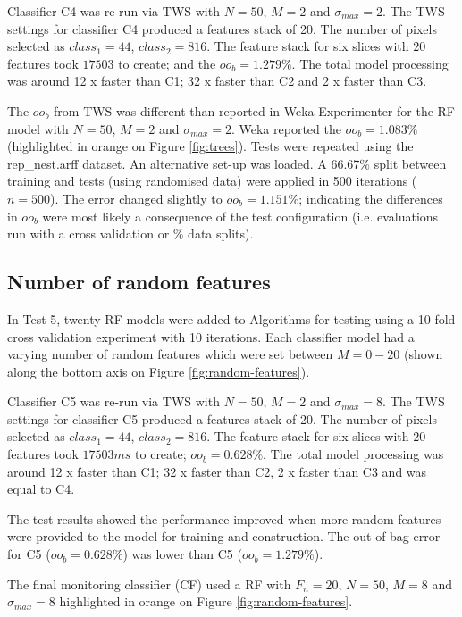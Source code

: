Classifier C4 was re-run via \ac{TWS} with $N = 50$, $ M = 2 $ and $ \sigma_{max} = 2 $. The \ac{TWS} settings for classifier C4 produced a features stack of 20. The number of pixels selected as $class_1 = 44$, $class_2 = 816$. The feature stack for six slices with $20$ features took $17503$ to create; and the $oo_b = 1.279\%$. The total model processing was around 12 x faster than C1; 32 x faster than C2 and 2 x faster than C3.

The $ oo_b $ from \ac{TWS} was different than reported in Weka Experimenter for the RF model with $N = 50$, $ M = 2 $ and $ \sigma_{max} = 2 $. Weka reported the $oo_b = 1.083\%$ (highlighted in orange on Figure \ref{fig:trees}). Tests were repeated using the rep\_nest.arff dataset. An alternative set-up was loaded. A 66.67\% split between training and tests (using randomised data) were applied in 500 iterations ($n = 500$). The error changed slightly to $oo_b = 1.151\%$; indicating the differences in $oo_b$ were most likely a consequence of the test configuration (i.e. evaluations run with a cross validation or \% data splits).

\subsection{Number of random features}\label{sec:number-of-random-features}
In Test 5, twenty \ac{RF} models were added to Algorithms for testing using a 10 fold cross validation experiment with 10 iterations. Each classifier model had a varying number of random features which were set between $M = 0-20$ (shown along the bottom axis on Figure \ref{fig:random-features}). 

Classifier C5 was re-run via \ac{TWS} with $N = 50$, $ M = 2 $ and $ \sigma_{max} = 8 $. The \ac{TWS} settings for classifier C5 produced a features stack of 20. The number of pixels selected as $class_1 = 44$, $class_2 = 816$. The feature stack for six slices with $20$ features took $17503ms$ to create; $oo_b = 0.628\%$. The total model processing was around 12 x faster than C1; 32 x faster than C2, 2 x faster than C3 and  was equal to C4.

The test results showed the performance improved when more random features were provided to the model for training and construction. The out of bag error for C5 ($oo_b = 0.628\%$) was lower than C5 ($oo_b = 1.279\%$). 

The final monitoring classifier (CF) used a \ac{RF} with $ F_{n} = 20 $, $ N = 50 $, $  M = 8 $ and $\sigma_{max} = 8 $ highlighted in orange on Figure \ref{fig:random-features}.

